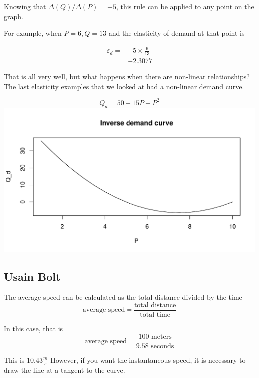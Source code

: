 \documentclass[12pt, a4paper, oneside]{article}\usepackage[]{graphicx}\usepackage[]{color}
\makeatletter
\def\maxwidth{ %
  \ifdim\Gin@nat@width>\linewidth
    \linewidth
  \else
    \Gin@nat@width
  \fi
}
\newenvironment{knitrout}{}{} %
\makeatother
\begin{document}
Knowing that $\Delta(Q)/\Delta(P) = -5$, this rule can be applied to any point on the graph.

For example, when $P = 6, Q = 13$ and the elasticity of demand at that point is 

\begin{align*}
\varepsilon_d =& -5 \times \frac{6}{13}\\
              =& -2.3077
\end{align*}

That is all very well, but what happens when there are non-linear relationships?  The last elasticity examples that we looked at had a non-linear demand curve. 

\begin{equation} 
Q_d = 50 -15P + P^2
\end{equation}
\begin{knitrout}
\color{fgcolor}
\includegraphics[width=\maxwidth]{figure/demand2-1} 

\end{knitrout}
\subsection{Usain Bolt}


The average speed can be calculated as the total distance divided by the time
\begin{equation*}
\text{average speed} = \frac{\text{total distance}}{\text{total time}}
\end{equation*}

In this case, that is 
\begin{equation*}
\text{average speed} = \frac{\text{100 meters}}{\text{9.58 seconds}}
\end{equation*}

This is $10.43\frac{m}{s}$
However, if you want the instantaneous speed, it is necessary to draw the line at a tangent to the curve. 
\end{document}
